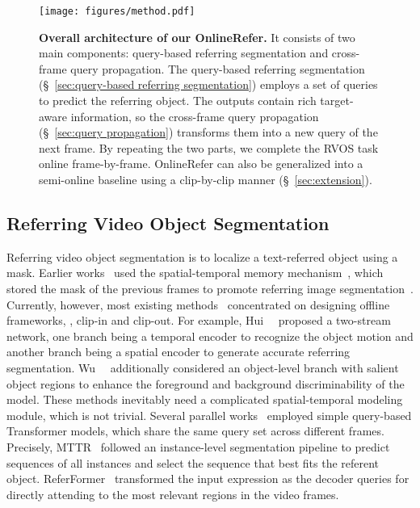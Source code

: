 \documentclass[10pt,twocolumn,letterpaper]{article}
\begin{document}
\begin{figure*}
\centering
	\texttt{[image: figures/method.pdf]}
	\vspace{-6pt}
	\caption{\textbf{Overall architecture of our OnlineRefer.} It consists of two main components: query-based referring segmentation and cross-frame query propagation. The query-based referring segmentation  (\S~\ref{sec:query-based referring segmentation}) employs a set of queries to predict the referring object. The outputs contain rich target-aware information, so the cross-frame query propagation (\S~\ref{sec:query propagation}) transforms them into a new query of the next frame. By repeating the two parts, we complete the RVOS task online frame-by-frame. OnlineRefer can also be generalized into a semi-online baseline using a clip-by-clip manner (\S~\ref{sec:extension}).
 }
	\vspace{-3mm}
	\label{fig:method}
\end{figure*}

\subsection{Referring Video Object Segmentation}

Referring video object segmentation is to localize a text-referred object using a mask.
Earlier works~\cite{khoreva2019video, URVOS} used the spatial-temporal memory mechanism~\cite{stm}, which stored the mask of the previous frames to promote referring image segmentation~\cite{yu2016modeling,CMSA,liu2017recurrent}. 
Currently, however, most existing methods~\cite{wang2019asymmetric,wang2020context,yang2021hierarchical,hui2021collaborative,ding2022language,li2022you,zhao2022modeling,mlsa,yan2023referred} concentrated on designing offline frameworks, \ie, clip-in and clip-out.
For example, Hui~\etal~\cite{hui2021collaborative} proposed a two-stream network, one branch being a temporal encoder to recognize the object motion and another branch being a spatial encoder to generate accurate referring segmentation.
Wu~\etal~\cite{mlsa} additionally considered an object-level branch with salient object regions to enhance the foreground and background discriminability of the model.
These methods inevitably need a complicated spatial-temporal modeling module, which is not trivial.
Several parallel works~\cite{mttr,referformer} employed simple query-based Transformer models, which share the same query set across different frames.
Precisely, MTTR~\cite{mttr} followed an instance-level segmentation pipeline to predict sequences of all instances and select the sequence that best fits the referent object. 
ReferFormer~\cite{referformer} transformed the input expression as the decoder queries for directly attending to the most relevant regions in the video frames.
\end{document}
